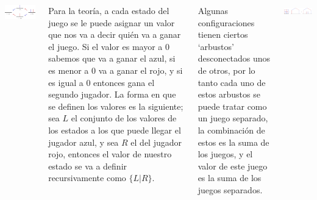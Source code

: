 \documentclass[20pt,margin=2.2cm,innermargin=-4.5in,blockverticalspace=-0.25in]{tikzposter}
\begin{document}
\begin{columns}
{        \begin{minipage}[c]{\linewidth}
            \begin{minipage}[c]{.4\linewidth}
                \centering
                \includegraphics[width=\textwidth]{images/hackenbush-surr_roots.pdf}
            \end{minipage}
            \quad\quad
            \begin{minipage}[c]{.532\linewidth}
                Para la teor\'ia, a cada estado del juego se le puede asignar un valor que nos va a decir qui\'en va a ganar el juego. Si el valor es mayor a $0$ sabemos que va a ganar el azul, si es menor a $0$ va a ganar el rojo, y si es igual a $0$ entonces gana el segundo jugador. La forma en que se definen los valores es la siguiente; sea $L$ el conjunto de los valores de los estados a los que puede llegar el jugador azul, y sea $R$ el del jugador rojo, entonces el valor de nuestro estado se va a definir recursivamente como $\{L|R\}$.
            \end{minipage}
        \end{minipage}

        \begin{minipage}[c]{\linewidth}
            \begin{minipage}[c]{.4\linewidth}
                Algunas configuraciones tienen ciertos `arbustos' desconectados unos de otros, por lo tanto cada uno de estos arbustos se puede tratar como un juego separado, la combinaci\'on de estos es la suma de los juegos, y el valor de este juego es la suma de los juegos separados.
            \end{minipage}
            \quad\quad
            \begin{minipage}[c]{.532\linewidth}
                \centering
                \includegraphics[width=\textwidth]{images/hackenbush-sum_example.pdf}
            \end{minipage}            
        \end{minipage}


}
\end{columns}
\end{document}
